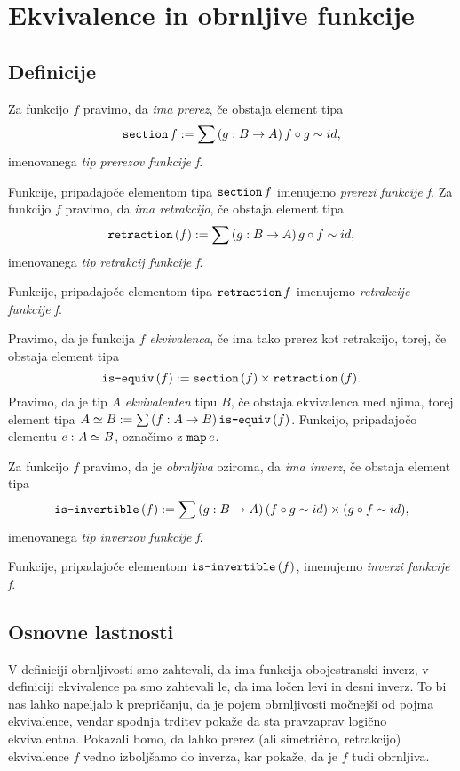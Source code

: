 \section{Ekvivalence in obrnljive funkcije}
\subsection{Definicije}
\begin{definicija}
  Za funkcijo \(f\) pravimo, da \emph{ima prerez}, če obstaja element tipa
  \[\textnormal{\texttt{section}}\, f := \sum \left( g : B \to A \right) f \circ g \sim id,\]
  imenovanega \emph{tip prerezov funkcije f}.

  Funkcije, pripadajoče elementom tipa \(\textnormal{\texttt{section}}\, f\) imenujemo \emph{prerezi funkcije f}.
  Za funkcijo \(f\) pravimo, da \emph{ima retrakcijo}, če obstaja element tipa
  \[\textnormal{\texttt{retraction}}\,(f) := \sum \left( g : B \to A \right) g \circ f \sim id,\]
  imenovanega \emph{tip retrakcij funkcije f}.

  Funkcije, pripadajoče elementom tipa \(\textnormal{\texttt{retraction}}\, f\) imenujemo \emph{retrakcije funkcije f}.
\end{definicija}

\begin{definicija}
  Pravimo, da je funkcija \(f\) \emph{ekvivalenca}, če ima tako prerez kot retrakcijo,
  torej, če obstaja element tipa \[\textnormal{\texttt{is-equiv}}\,(f) := \textnormal{\texttt{section}}\,(f) \times \textnormal{\texttt{retraction}}\,(f).\]
  Pravimo, da je tip \(A\) \emph{ekvivalenten} tipu \(B\), če obstaja ekvivalenca med
  njima, torej element tipa \(A \simeq B := \sum \left( f : A \to B \right) \textnormal{\texttt{is-equiv}}\,(f)\). Funkcijo,
  pripadajočo elementu \(e \,\colon A \simeq B\), označimo z \(\textnormal{\texttt{map}}\, e\).
\end{definicija}

\begin{definicija}
  Za funkcijo \(f\) pravimo, da je \emph{obrnljiva} oziroma, da \emph{ima inverz},
  če obstaja element tipa
  \[\textnormal{\texttt{is-invertible}}\,(f) := \sum \left( g : B \to A \right) (f \circ g \sim id) \times (g \circ f \sim id),\]
  imenovanega \emph{tip inverzov funkcije f}.

  Funkcije, pripadajoče elementom \(\textnormal{\texttt{is-invertible}}\,(f)\), imenujemo \emph{inverzi funkcije f}.
\end{definicija}

\subsection{Osnovne lastnosti}

V definiciji obrnljivosti smo zahtevali, da ima funkcija obojestranski inverz, v
definiciji ekvivalence pa smo zahtevali le, da ima ločen levi in desni inverz.
To bi nas lahko
napeljalo k prepričanju, da je pojem obrnljivosti močnejši od pojma ekvivalence, vendar
spodnja trditev pokaže da sta pravzaprav logično ekvivalentna. Pokazali bomo, da lahko
prerez (ali simetrično, retrakcijo) ekvivalence \(f\) vedno izboljšamo do inverza,
kar pokaže, da je \(f\) tudi obrnljiva.

